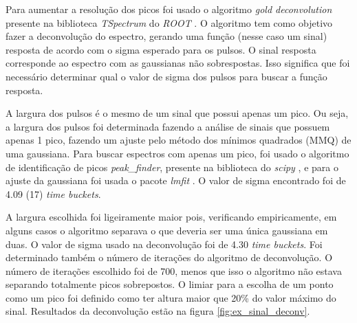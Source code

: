 \documentclass[a4paper,12pt,oneside]{book}
\begin{document}
\par Para aumentar a resolução dos picos foi usado o algoritmo \textit{gold deconvolution} presente na biblioteca \textit{TSpectrum} do \textit{ROOT} \cite{paper_gold_deconv}. O algoritmo tem como objetivo fazer a deconvolução do espectro, gerando uma função (nesse caso um sinal) resposta de acordo com o sigma esperado para os pulsos. O sinal resposta corresponde ao espectro com as gaussianas não sobrespostas. Isso significa que foi necessário determinar qual o valor de sigma dos pulsos para buscar a função resposta.

\par A largura dos pulsos é o mesmo de um sinal que possui apenas um pico. Ou seja, a largura dos pulsos foi determinada fazendo a análise de sinais que possuem apenas 1 pico, fazendo um ajuste pelo método dos mínimos quadrados (MMQ) de uma gaussiana. Para buscar espectros com apenas um pico, foi usado o algoritmo de identificação de picos \textit{peak\_finder}, presente na biblioteca do \textit{scipy} \cite{scipy}, e para o ajuste da gaussiana foi usada o pacote \textit{lmfit} \cite{lmfit}. O valor de sigma encontrado foi de 4.09 (17) \textit{time buckets}.

\par A largura escolhida foi ligeiramente maior pois, verificando empiricamente, em alguns casos o algoritmo separava o que deveria ser uma única gaussiana em duas. O valor de sigma usado na deconvolução foi de 4.30 \textit{time buckets}. Foi determinado também o número de iterações do algoritmo de deconvolução. O número de iterações escolhido foi de 700, menos que isso o algoritmo não estava separando totalmente picos sobrepostos. O limiar para a escolha de um ponto como um pico foi definido como ter altura maior que 20\% do valor máximo do sinal. Resultados da deconvolução estão na figura \ref{fig:ex_sinal_deconv}.
\end{document}
